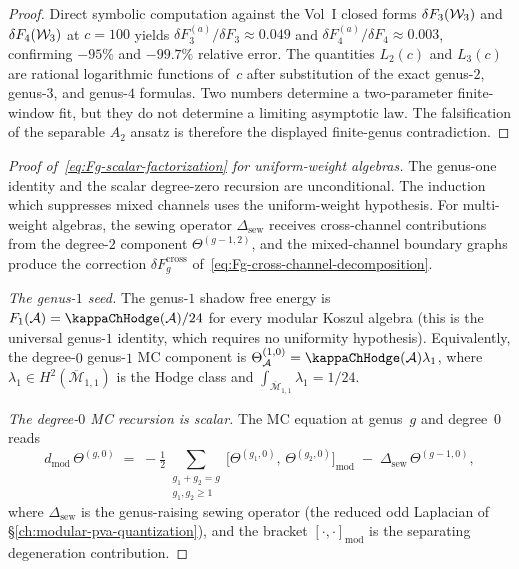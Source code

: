 \begin{proof}
Direct symbolic computation against the Vol~I closed forms
$\delta F_3(\mathcal{W}_3)$ and $\delta F_4(\mathcal{W}_3)$ at $c = 100$ yields
$\delta F_3^{(a)}/\delta F_3 \approx 0.049$ and
$\delta F_4^{(a)}/\delta F_4 \approx 0.003$, confirming
$-95\%$ and $-99.7\%$ relative error. The quantities $L_2(c)$ and
$L_3(c)$ are rational logarithmic functions of~$c$ after substitution
of the exact genus-$2$, genus-$3$, and genus-$4$ formulas. Two
numbers determine a two-parameter finite-window fit, but they do not
determine a limiting asymptotic law. The falsification of the
separable $A_2$ ansatz is therefore the displayed finite-genus
contradiction.
\end{proof}

\begin{proof}[Proof of~\eqref{eq:Fg-scalar-factorization}
for uniform-weight algebras]
The genus-one identity and the scalar degree-zero recursion are
unconditional.  The induction which suppresses mixed channels uses
the uniform-weight hypothesis.  For multi-weight algebras, the sewing
operator
$\Delta_{\mathrm{sew}}$ receives cross-channel contributions
from the degree-$2$ component $\Theta^{(g-1,2)}$,
and the mixed-channel boundary graphs produce the correction
$\delta F_g^{\mathrm{cross}}$ of~\eqref{eq:Fg-cross-channel-decomposition}.

\emph{The genus-$1$ seed.} The genus-$1$ shadow free energy
is $F_1(\cA) = \kappaChHodge(\cA)/24$ for every modular Koszul
algebra (this is the universal genus-$1$ identity, which requires no
uniformity hypothesis). Equivalently, the degree-$0$ genus-$1$ MC
component is
\(\Theta^{(1,0)}_\cA=\kappaChHodge(\cA)\lambda_1\), where
\(\lambda_1\in H^2(\overline{\mathcal{M}}_{1,1})\) is the Hodge
class and
\(\int_{\overline{\mathcal{M}}_{1,1}}\lambda_1=1/24\).

\emph{The degree-$0$ MC recursion is scalar.} The MC
equation at genus~$g$ and degree~$0$ reads
\begin{equation}\label{eq:MC-genus-g-degree-0}
d_{\mathrm{mod}}\,\Theta^{(g,0)}
\;=\; -\tfrac{1}{2}
\sum_{\substack{g_1 + g_2 = g\\g_1, g_2 \geq 1}}
\bigl[\Theta^{(g_1,0)},\, \Theta^{(g_2,0)}\bigr]_{\mathrm{mod}}
\;-\; \Delta_{\mathrm{sew}}\,\Theta^{(g-1,0)},
\end{equation}
where $\Delta_{\mathrm{sew}}$ is the genus-raising sewing
operator (the reduced odd Laplacian of
\S\ref{ch:modular-pva-quantization}), and the bracket
$[\cdot,\cdot]_{\mathrm{mod}}$ is the separating degeneration
contribution.


\end{proof}
